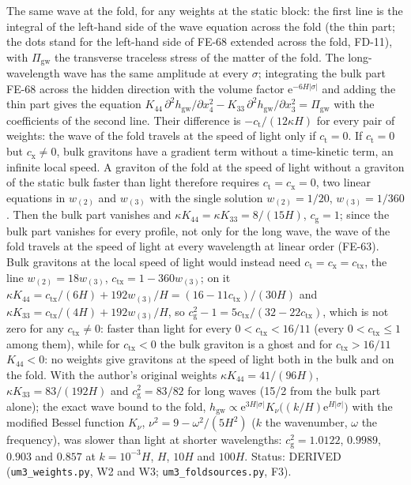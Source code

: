 \documentclass[
  10pt,
]{article}
\begin{document}
The same wave at the fold, for any weights at the static block: the
first line is the integral of the left-hand side of the wave equation
across the fold (the thin part; the dots stand for the left-hand side of
FE-68 extended across the fold, FD-11), with \(\Pi_{\mathrm{gw}}\) the
transverse traceless stress of the matter of the fold. The
long-wavelength wave has the same amplitude at every \(\sigma\);
integrating the bulk part FE-68 across the hidden direction with the
volume factor \(\mathrm{e}^{-6H\lvert\sigma\rvert}\) and adding the thin
part gives the equation
\(K_{44}\,\partial^2h_{\mathrm{gw}}/\partial x_4^2 - K_{33}\,\partial^2h_{\mathrm{gw}}/\partial x_3^2 = \Pi_{\mathrm{gw}}\)
with the coefficients of the second line. Their difference is
\(-c_{\mathrm{t}}/(12\kappa H)\) for every pair of weights: the wave of
the fold travels at the speed of light only if \(c_{\mathrm{t}} = 0\).
If \(c_{\mathrm{t}} = 0\) but \(c_{\mathrm{x}} \ne 0\), bulk gravitons
have a gradient term without a time-kinetic term, an infinite local
speed. A graviton of the fold at the speed of light without a graviton
of the static bulk faster than light therefore requires
\(c_{\mathrm{t}} = c_{\mathrm{x}} = 0\), two linear equations in
\(w_{(2)}\) and \(w_{(3)}\) with the single solution \(w_{(2)} = 1/20\),
\(w_{(3)} = 1/360\). Then the bulk part vanishes and
\(\kappa K_{44} = \kappa K_{33} = 8/(15H)\), \(c_{\mathrm{g}} = 1\);
since the bulk part vanishes for every profile, not only for the long
wave, the wave of the fold travels at the speed of light at every
wavelength at linear order (FE-63). Bulk gravitons at the local speed of
light would instead need
\(c_{\mathrm{t}} = c_{\mathrm{x}} = c_{\mathrm{tx}}\), the line
\(w_{(2)} = 18w_{(3)}\), \(c_{\mathrm{tx}} = 1 - 360w_{(3)}\); on it
\(\kappa K_{44} = c_{\mathrm{tx}}/(6H) + 192w_{(3)}/H = (16 - 11c_{\mathrm{tx}})/(30H)\)
and \(\kappa K_{33} = c_{\mathrm{tx}}/(4H) + 192w_{(3)}/H\), so
\(c_{\mathrm{g}}^2 - 1 = 5c_{\mathrm{tx}}/(32 - 22c_{\mathrm{tx}})\),
which is not zero for any \(c_{\mathrm{tx}} \ne 0\): faster than light
for every \(0 < c_{\mathrm{tx}} < 16/11\) (every
\(0 < c_{\mathrm{tx}} \le 1\) among them), while for
\(c_{\mathrm{tx}} < 0\) the bulk graviton is a ghost and for
\(c_{\mathrm{tx}} > 16/11\) \(K_{44} < 0\): no weights give gravitons at
the speed of light both in the bulk and on the fold. With the author's
original weights \(\kappa K_{44} = 41/(96H)\),
\(\kappa K_{33} = 83/(192H)\) and \(c_{\mathrm{g}}^2 = 83/82\) for long
waves (15/2 from the bulk part alone); the exact wave bound to the fold,
\(h_{\mathrm{gw}} \propto \mathrm{e}^{3H\lvert\sigma\rvert}K_\nu\big((k/H)\mathrm{e}^{H\lvert\sigma\rvert}\big)\)
with the modified Bessel function \(K_\nu\),
\(\nu^2 = 9 - \omega^2/(5H^2)\) (\(k\) the wavenumber, \(\omega\) the
frequency), was slower than light at shorter wavelengths:
\(c_{\mathrm{g}}^2 = 1.0122\), \(0.9989\), \(0.903\) and \(0.857\) at
\(k = 10^{-3}H\), \(H\), \(10H\) and \(100H\). Status: DERIVED
(\texttt{um3\_weights.py}, W2 and W3; \texttt{um3\_foldsources.py}, F3).
\end{document}

